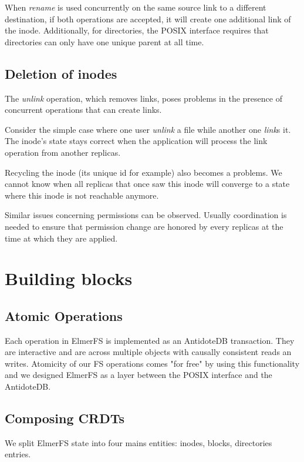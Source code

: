 \documentclass[sigplan, 10pt]{acmart}
\begin{document}
When \textit{rename} is used concurrently on the same source link to a different
destination, if both operations are accepted, it will create one additional
link of the inode. Additionally, for directories, the POSIX interface requires
that directories can only have one unique parent at all time.

\subsection{Deletion of inodes}

The \textit{unlink} operation, which removes links, poses problems
in the presence of concurrent operations that can create links.

Consider the simple case where one user \textit{unlink} a file while another
one \textit{link}s it. The inode's state stays correct when the
application will process the link operation from another replicas.

Recycling the inode (its unique id for example) also becomes a problems.
We cannot know when all replicas that once saw this inode
will converge to a state where this inode is not reachable anymore.

Similar issues concerning permissions can be observed. Usually coordination is
needed to ensure that permission change are honored by every replicas at
the time at which they are applied.

\section{Building blocks}

\subsection{Atomic Operations}

Each operation in ElmerFS is implemented as an AntidoteDB transaction.
They are interactive and are across multiple objects with causally consistent
reads an writes. Atomicity of our FS operations comes "for free" by using
this functionality and we designed ElmerFS as a layer between the POSIX
interface and the AntidoteDB.

\subsection{Composing CRDTs}

We split ElmerFS state into four mains entities: inodes,
blocks, directories entries.
\end{document}
